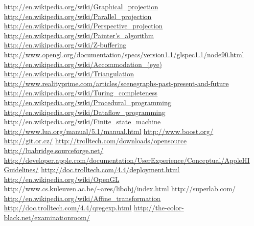 \begin{thebibliography}{12}
 \url{http://en.wikipedia.org/wiki/Graphical_projection}
 \url{http://en.wikipedia.org/wiki/Parallel_projection}
 \url{http://en.wikipedia.org/wiki/Perspective_projection}
 \url{http://en.wikipedia.org/wiki/Painter's_algorithm}
 \url{http://en.wikipedia.org/wiki/Z-buffering}
 \url{http://www.opengl.org/documentation/specs/version1.1/glspec1.1/node90.html}
 \url{http://en.wikipedia.org/wiki/Accommodation_(eye)}
 \url{http://en.wikipedia.org/wiki/Triangulation}
 \url{http://www.realityprime.com/articles/scenegraphs-past-present-and-future}
 \url{http://en.wikipedia.org/wiki/Turing_completeness}
 \url{http://en.wikipedia.org/wiki/Procedural_programming}
 \url{http://en.wikipedia.org/wiki/Dataflow_programming}
 \url{http://en.wikipedia.org/wiki/Finite_state_machine}
 \url{http://www.lua.org/manual/5.1/manual.html}
 \url{http://www.boost.org/}
 \url{http://git.or.cz/}
 \url{http://trolltech.com/downloads/opensource}
 \url{http://luabridge.sourceforge.net/}
 \url{http://developer.apple.com/documentation/UserExperience/Conceptual/AppleHIGuidelines/}
 \url{http://doc.trolltech.com/4.4/deployment.html}
 \url{http://en.wikipedia.org/wiki/OpenGL}
 \url{http://www.cs.kuleuven.ac.be/~ares/libobj/index.html}
 \url{http://superlab.com/}
 \url{http://en.wikipedia.org/wiki/Affine_transformation}
 \url{http://doc.trolltech.com/4.4/qregexp.html}
 \url{http://the-color-black.net/examinationroom/}
\end{thebibliography}
